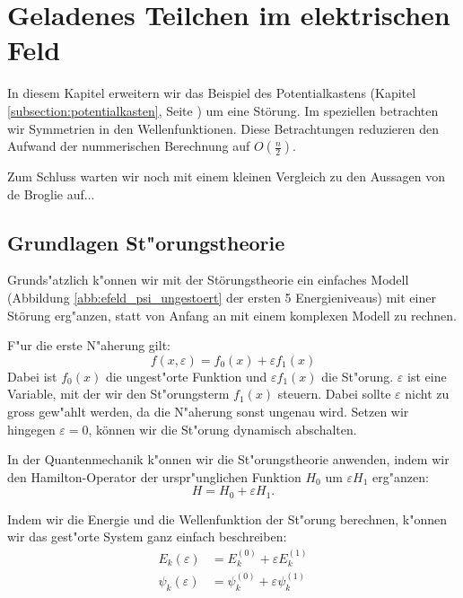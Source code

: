 \chapter{Geladenes Teilchen im elektrischen Feld\label{chapter:efeld}}
\begin{refsection}



In diesem Kapitel erweitern wir das Beispiel des Potentialkastens 
(Kapitel \ref{subsection:potentialkasten}, Seite \pageref{subsection:potentialkasten})
um eine St\"orung.
Im speziellen betrachten wir Symmetrien in den Wellenfunktionen.
Diese Betrachtungen reduzieren den Aufwand der nummerischen Berechnung auf $O(\frac{n}{2})$.

Zum Schluss warten wir noch mit einem kleinen Vergleich zu den Aussagen von de Broglie auf...

\section{Grundlagen St"orungstheorie}
Grunds"atzlich k"onnen wir mit der St\"orungstheorie ein einfaches Modell 
(Abbildung \ref{abb:efeld_psi_ungestoert} der ersten 5 Energieniveaus) 
mit einer St\"orung erg"anzen, statt von Anfang an mit einem komplexen Modell zu rechnen.

F"ur die erste N"aherung gilt:
\[
  f(x, \varepsilon) = f_0(x) + \varepsilon f_1(x)
\]
Dabei ist $f_0(x)$ die ungest"orte Funktion und $\varepsilon f_1(x)$ die St"orung.
$\varepsilon$ ist eine Variable, mit der wir den St"orungsterm $f_1(x)$ steuern.
Dabei sollte $\varepsilon$ nicht zu gross gew"ahlt werden,
da die N"aherung sonst ungenau wird.
Setzen wir hingegen $\varepsilon = 0$, k\"onnen wir die St"orung dynamisch abschalten.




In der Quantenmechanik k"onnen wir die St"orungstheorie anwenden,
indem wir den Hamilton-Operator der urspr"unglichen Funktion $H_0$
um $\varepsilon H_1$ erg"anzen:
\[
  H = H_0 + \varepsilon H_1.
\]

Indem wir die Energie und die Wellenfunktion der St"orung berechnen, k"onnen wir das gest"orte System ganz einfach beschreiben:
\begin{equation}
\begin{aligned}
E_k(\varepsilon)&=E_k^{(0)} + \varepsilon E_k^{(1)}
\\
\psi_k(\varepsilon)&=\psi_k^{(0)} + \varepsilon \psi_k^{(1)}
\end{aligned}
\end{equation}


\end{refsection}

